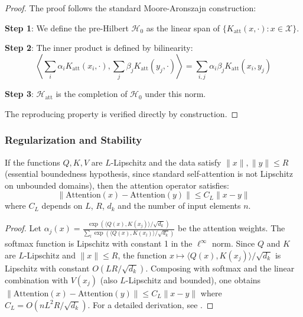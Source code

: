 \begin{proof}
    The proof follows the standard Moore-Aronszajn construction:

    \textbf{Step 1}: We define the pre-Hilbert $\mathcal{H}_0$ as the linear span of $\{K_{\text{att}}(x, \cdot) : x \in \mathcal{X}\}$.

    \textbf{Step 2}: The inner product is defined by bilinearity:
    \[\left\langle \sum_i \alpha_i K_{\text{att}}(x_i, \cdot), \sum_j \beta_j K_{\text{att}}(y_j, \cdot) \right\rangle = \sum_{i,j} \alpha_i \beta_j K_{\text{att}}(x_i, y_j)\]

    \textbf{Step 3}: $\mathcal{H}_{\text{att}}$ is the completion of $\mathcal{H}_0$ under this norm.

    The reproducing property is verified directly by construction.
\end{proof}

\subsubsection{Regularization and Stability}

\begin{proposition}\label{prop:lipschitz_stability_attention}
    If the functions $Q, K, V$ are $L$-Lipschitz and the data satisfy $\|x\|, \|y\| \leq R$ (essential boundedness hypothesis, since standard self-attention is not Lipschitz on unbounded domains), then the attention operator satisfies:
    \begin{equation}
        \|\text{Attention}(x) - \text{Attention}(y)\| \leq C_L \|x - y\|
        \label{eq:lipschitz_bound_attention}
    \end{equation}
    where $C_L$ depends on $L$, $R$, $d_k$ and the number of input elements $n$.
\end{proposition}

\begin{proof}
Let $\alpha_j(x) = \frac{\exp(\langle Q(x), K(x_j)\rangle / \sqrt{d_k})}{\sum_l \exp(\langle Q(x), K(x_l)\rangle / \sqrt{d_k})}$ be the attention weights. The softmax function is Lipschitz with constant 1 in the $\ell^\infty$ norm. Since $Q$ and $K$ are $L$-Lipschitz and $\|x\| \leq R$, the function $x \mapsto \langle Q(x), K(x_j)\rangle / \sqrt{d_k}$ is Lipschitz with constant $O(LR/\sqrt{d_k})$. Composing with softmax and the linear combination with $V(x_j)$ (also $L$-Lipschitz and bounded), one obtains $\|\text{Attention}(x) - \text{Attention}(y)\| \leq C_L \|x - y\|$ where $C_L = O(nL^2R/\sqrt{d_k})$. For a detailed derivation, see \citep{kim2021lipschitz}.
\end{proof}

